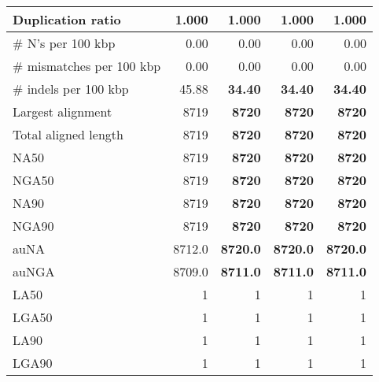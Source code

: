\documentclass[12pt,a4paper]{article}
\begin{document}
\begin{table}[ht]
\begin{center}
\begin{tabular}{|l*{4}{|r}|}
Duplication ratio & 1.000 & 1.000 & 1.000 & 1.000 \\ \hline
\# N's per 100 kbp & 0.00 & 0.00 & 0.00 & 0.00 \\ \hline
\# mismatches per 100 kbp & 0.00 & 0.00 & 0.00 & 0.00 \\ \hline
\# indels per 100 kbp & 45.88 & {\bf 34.40} & {\bf 34.40} & {\bf 34.40} \\ \hline
Largest alignment & 8719 & {\bf 8720} & {\bf 8720} & {\bf 8720} \\ \hline
Total aligned length & 8719 & {\bf 8720} & {\bf 8720} & {\bf 8720} \\ \hline
NA50 & 8719 & {\bf 8720} & {\bf 8720} & {\bf 8720} \\ \hline
NGA50 & 8719 & {\bf 8720} & {\bf 8720} & {\bf 8720} \\ \hline
NA90 & 8719 & {\bf 8720} & {\bf 8720} & {\bf 8720} \\ \hline
NGA90 & 8719 & {\bf 8720} & {\bf 8720} & {\bf 8720} \\ \hline
auNA & 8712.0 & {\bf 8720.0} & {\bf 8720.0} & {\bf 8720.0} \\ \hline
auNGA & 8709.0 & {\bf 8711.0} & {\bf 8711.0} & {\bf 8711.0} \\ \hline
LA50 & 1 & 1 & 1 & 1 \\ \hline
LGA50 & 1 & 1 & 1 & 1 \\ \hline
LA90 & 1 & 1 & 1 & 1 \\ \hline
LGA90 & 1 & 1 & 1 & 1 \\ \hline
\end{tabular}
\end{center}
\end{table}
\end{document}
